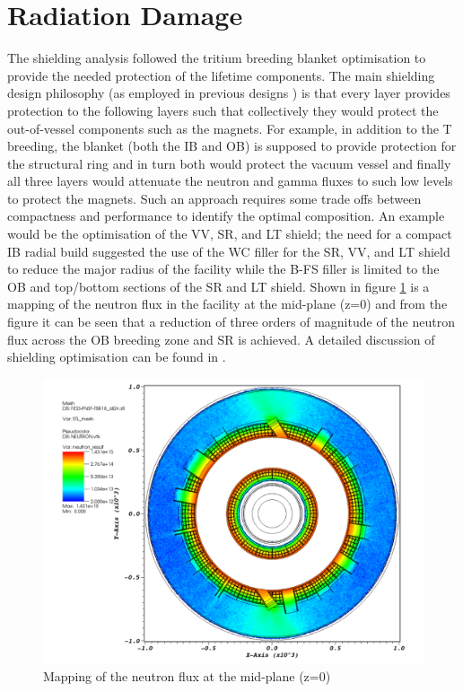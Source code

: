 \documentclass[12pt, letterpaper]{elsarticle}
\begin{document}
\section{Radiation Damage} \label{Radiation Damage}
The shielding analysis followed the tritium breeding blanket optimisation to provide the needed protection of the lifetime components. The main shielding design philosophy (as employed in previous designs \cite{ref_14}) is that every layer provides protection to the following layers such that collectively they would protect the out-of-vessel components such as the magnets. For example, in addition to the T breeding, the blanket (both the IB and OB) is supposed to provide protection for the structural ring and in turn both would protect the vacuum vessel and finally all three layers would attenuate the neutron and gamma fluxes to such low levels to protect the magnets. Such an approach requires some trade offs between compactness and performance to identify the optimal composition. An example would be the optimisation of the VV, SR, and LT shield; the need for a compact IB radial build suggested the use of the WC filler for the SR, VV, and LT shield to reduce the major radius of the facility while the B-FS filler is limited to the OB and top/bottom sections of the SR and LT shield. Shown in figure \ref{fig:flux mapping} is a mapping of the neutron flux in the facility at the mid-plane (z=0) and from the figure it can be seen that a reduction of three orders of magnitude of the neutron flux across the OB breeding zone and SR is achieved. A detailed discussion of shielding optimisation can be found in \cite{ref_2}. 
\begin{figure}[h!]
	\centering
	\includegraphics[scale=0.4]{../plots/flux.png}
	\caption{Mapping of the neutron flux at the mid-plane (z=0)}
	\label{fig:flux mapping}
\end{figure}
\end{document}
